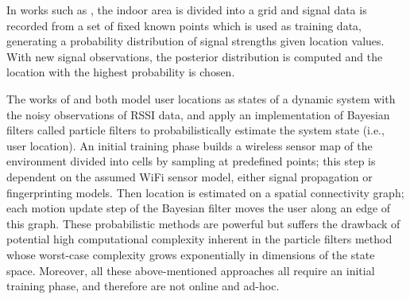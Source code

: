 In works such as \cite{roos2002probabilistic,smailagic2002location}, the indoor
area is divided into a grid and signal data is recorded from a set of fixed
known points which is used as training data, generating a probability
distribution of signal strengths given location values.  With new signal
observations, the posterior distribution is computed and the location with the
highest probability is chosen.  

The works of \cite{seshadri2005bayesian} and \cite{letchner2005large} both
model user locations as states of a dynamic system with the noisy observations
of RSSI data, and apply an implementation of Bayesian filters called particle
filters to probabilistically estimate the system state (i.e., user location).
An initial training phase builds a wireless sensor map of the environment
divided into cells by sampling at predefined points; this step is dependent on
the assumed WiFi sensor model, either signal propagation or fingerprinting
models.  Then location is estimated on a spatial connectivity graph; each
motion update step of the Bayesian filter moves the user along an edge of this
graph.  These probabilistic methods are powerful but suffers the drawback of
potential high computational complexity inherent in the particle filters method
whose worst-case complexity grows exponentially in dimensions of the state
space.  Moreover, all these above-mentioned approaches all require an initial
training phase, and therefore are not online and ad-hoc.

